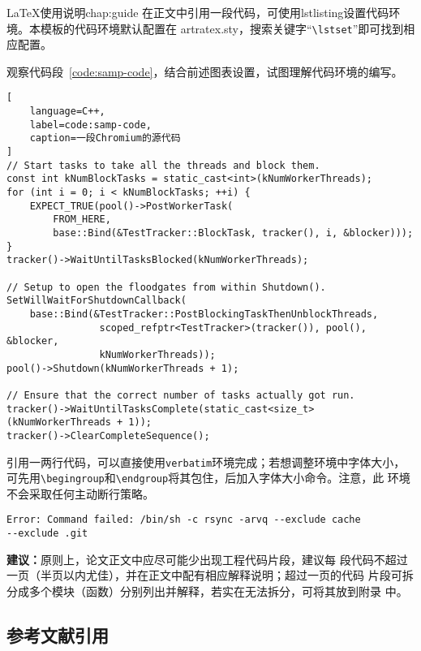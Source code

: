 \begin{cuzchapter}{\LaTeX{}使用说明}{chap:guide}
在正文中引用一段代码，可使用lstlisting设置代码环境。本模板的代码环境默认配置在
artratex.sty，搜索关键字“\verb|\lstset|”即可找到相应配置。

观察代码段~\ref{code:samp-code}，结合前述图表设置，试图理解代码环境的编写。

\begin{lstlisting}[
    language=C++,
    label=code:samp-code,
    caption=一段Chromium的源代码
]
// Start tasks to take all the threads and block them.
const int kNumBlockTasks = static_cast<int>(kNumWorkerThreads);
for (int i = 0; i < kNumBlockTasks; ++i) {
    EXPECT_TRUE(pool()->PostWorkerTask(
        FROM_HERE,
        base::Bind(&TestTracker::BlockTask, tracker(), i, &blocker)));
}
tracker()->WaitUntilTasksBlocked(kNumWorkerThreads);

// Setup to open the floodgates from within Shutdown().
SetWillWaitForShutdownCallback(
    base::Bind(&TestTracker::PostBlockingTaskThenUnblockThreads,
                scoped_refptr<TestTracker>(tracker()), pool(), &blocker,
                kNumWorkerThreads));
pool()->Shutdown(kNumWorkerThreads + 1);

// Ensure that the correct number of tasks actually got run.
tracker()->WaitUntilTasksComplete(static_cast<size_t>(kNumWorkerThreads + 1));
tracker()->ClearCompleteSequence();
\end{lstlisting}

引用一两行代码，可以直接使用\texttt{verbatim}环境完成；若想调整环境中字体大小，
可先用\verb|\begingroup|和\verb|\endgroup|将其包住，后加入字体大小命令。注意，此
环境不会采取任何主动断行策略。

\begingroup
    \small
    \begin{verbatim}
Error: Command failed: /bin/sh -c rsync -arvq --exclude cache
--exclude .git 
    \end{verbatim}
\endgroup

\begin{leftbar}
    \noindent\textbf{建议：}原则上，论文正文中应尽可能少出现工程代码片段，建议每
    段代码不超过一页（半页以内尤佳），并在正文中配有相应解释说明；超过一页的代码
    片段可拆分成多个模块（函数）分别列出并解释，若实在无法拆分，可将其放到附录
    中。
\end{leftbar}

\subsection{参考文献引用}\label{sub:references}


\end{cuzchapter}
